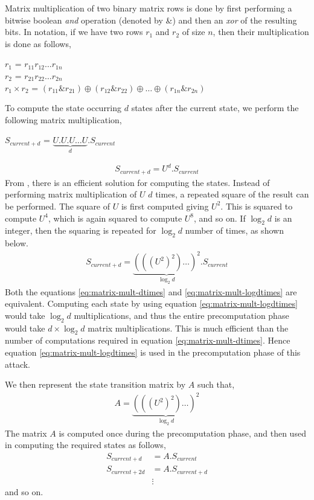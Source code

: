 Matrix multiplication of two binary matrix rows is done by first performing a bitwise boolean \emph{and} operation (denoted by \&) and then an \emph{xor} of the resulting bits. In notation, if we have two rows $r_1$ and $r_2$ of size $n$, then their multiplication is done as follows,
\begin{center}
$r_1$ = $r_{11} r_{12} \ldots r_{1n}$\\
$r_2$ = $r_{21} r_{22} \ldots r_{2n}$\\
$r_1 \times r_2$ = $(r_{11} \& r_{21}) \oplus (r_{12} \& r_{22}) \oplus \ldots \oplus (r_{1n} \& r_{2n})$
\end{center}
To compute the state occurring $d$ states after the current state, we perform the following matrix multiplication,
\begin{center}
$S_{current + d}$ = $\underbrace{U . U . U \dots U}_{d} . S_{current}$\\
\end{center}
\begin{align}
\label{eq:matrix-mult-dtimes} S_{current + d} = U^d . S_{current}
\end{align}
From \cite{erik-discussions}, there is an efficient solution for computing the states. Instead of performing matrix multiplication of $U$ $d$ times, a repeated square of the result can be performed. The square of $U$ is first computed giving $U^2$. This is squared to compute $U^4$, which is again squared to compute $U^8$, and so on. If $\log_2{d}$ is an integer, then the squaring is repeated for $\log_2{d}$ number of times, as shown below.
\begin{align}
\label{eq:matrix-mult-logdtimes} S_{current + d} = \underbrace{(((U^2)^2) \dotsc )^2}_{\log_2{d}} . S_{current}
\end{align}
Both the equations \ref{eq:matrix-mult-dtimes} and \ref{eq:matrix-mult-logdtimes} are equivalent. Computing each state by using equation \ref{eq:matrix-mult-logdtimes} would take $\log_2{d}$ multiplications, and thus the entire precomputation phase would take $d \times \log_2{d}$ matrix multiplications. This is much efficient than the number of computations required in equation \ref{eq:matrix-mult-dtimes}. Hence equation \ref{eq:matrix-mult-logdtimes} is used in the precomputation phase of this attack.

We then represent the state transition matrix by $A$ such that,
\begin{align}
\label{eq:state-trans-matrix} A = \underbrace{(((U^2)^2) \dotsc )^2}_{\log_2{d}}
\end{align}
The matrix $A$ is computed once during the precomputation phase, and then used in computing the required states as follows,
\begin{align*}
S_{current + d} &= A . S_{current}\\
S_{current + 2d} &= A . S_{current + d}\\
&\vdots
\end{align*}
and so on.

